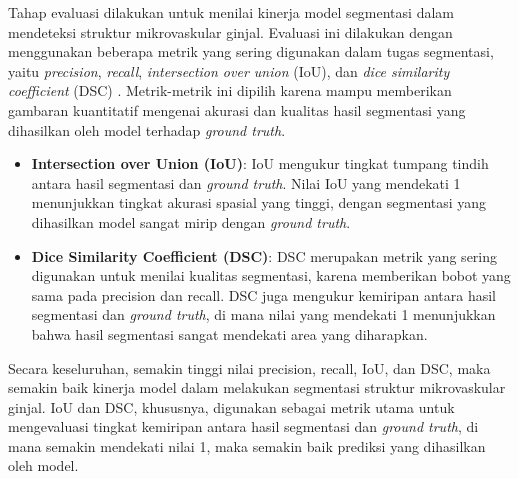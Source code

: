 \noindent Tahap evaluasi dilakukan untuk menilai kinerja model segmentasi dalam mendeteksi struktur mikrovaskular ginjal. Evaluasi ini dilakukan dengan menggunakan beberapa metrik yang sering digunakan dalam tugas segmentasi, yaitu \textit{precision}, \textit{recall}, \textit{intersection over union} (IoU), dan \textit{dice similarity coefficient} (DSC) \cite{jiang_iu-net_2023}. Metrik-metrik ini dipilih karena mampu memberikan gambaran kuantitatif mengenai akurasi dan kualitas hasil segmentasi yang dihasilkan oleh model terhadap \textit{ground truth}.

\begin{itemize}
	
	
	\item \textbf{Intersection over Union (IoU)}: IoU mengukur tingkat tumpang tindih antara hasil segmentasi dan \textit{ground truth}. Nilai IoU yang mendekati 1 menunjukkan tingkat akurasi spasial yang tinggi, dengan segmentasi yang dihasilkan model sangat mirip dengan \textit{ground truth}.
	
	\item \textbf{Dice Similarity Coefficient (DSC)}: DSC merupakan metrik yang sering digunakan untuk menilai kualitas segmentasi, karena memberikan bobot yang sama pada precision dan recall. DSC juga mengukur kemiripan antara hasil segmentasi dan \textit{ground truth}, di mana nilai yang mendekati 1 menunjukkan bahwa hasil segmentasi sangat mendekati area yang diharapkan.
\end{itemize}

Secara keseluruhan, semakin tinggi nilai precision, recall, IoU, dan DSC, maka semakin baik kinerja model dalam melakukan segmentasi struktur mikrovaskular ginjal. IoU dan DSC, khususnya, digunakan sebagai metrik utama untuk mengevaluasi tingkat kemiripan antara hasil segmentasi dan \textit{ground truth}, di mana semakin mendekati nilai 1, maka semakin baik prediksi yang dihasilkan oleh model.


